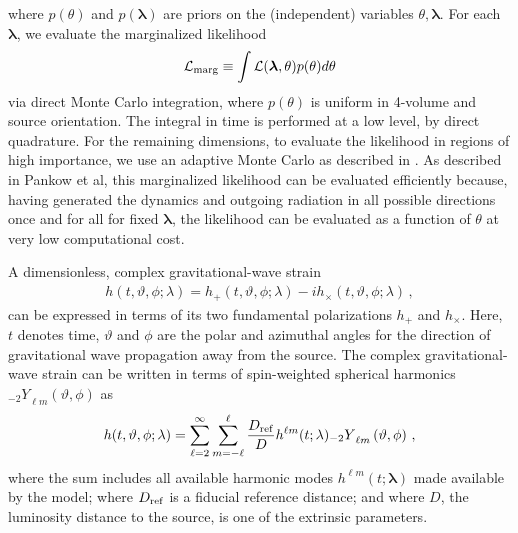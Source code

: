 \documentclass[twocolumn,prd,nofootinbib]{revtex4}
\newcommand\Y[1]{{{}_{#1}Y}}
\begin{document}
where $p(\theta)$ and $p(\bm{\lambda})$ are priors on the (independent) variables $\theta ,\bm{\lambda}$. For each $\bm{\lambda}$, we evaluate the marginalized likelihood
\begin{equation}
 {\cal L}_{\rm marg}\equiv\int  {\cal L}(\bm{\lambda} ,\theta )p(\theta )d\theta
\end{equation}
via direct Monte Carlo integration, where $p(\theta)$ is uniform in 4-volume and source orientation.  
The integral in time is performed at a low level, by direct quadrature. 
For the remaining dimensions, to evaluate the likelihood in regions of high importance, we use an adaptive Monte Carlo as described in
\cite{gwastro-PE-AlternativeArchitectures}.    As described in Pankow et al, this marginalized likelihood can be evaluated efficiently
because, having generated the dynamics and outgoing radiation in all possible directions once and for all for fixed
$\mathbf{\lambda}$, the likelihood can be evaluated as a function of $\theta$ at very low computational cost.


A dimensionless, complex gravitational-wave
strain
\begin{align} \label{eq:strain}
h(t,\vartheta,\phi;\lambda) =  h_+(t,\vartheta,\phi;\lambda) - 
                                i h_\times (t,\vartheta,\phi;\lambda) \, ,
\end{align}
can be expressed in terms of its two fundamental polarizations $h_+$ and $h_\times$.
Here, $t$ denotes time, $\vartheta$ and $\phi$ are the polar and azimuthal angles
for the direction of gravitational wave propagation away from the source. 
The complex gravitational-wave strain can be written in terms of
spin-weighted spherical harmonics $\Y{-2}_{\ell m} \left(\vartheta, \phi \right)$ as 
\begin{align} \label{eq:strain_mode}
h(t,\vartheta,\phi;\lambda) = 
\sum_{\ell=2}^{\infty} \sum_{m=-\ell}^{\ell} \frac{D_{\rm ref}}{D} h^{\ell m}(t;\lambda) \Y{-2}_{\ell m} \left(\vartheta, \phi \right) \, ,
\end{align}
where the sum includes all available harmonic modes $h^{\ell m}(t;\pmb{\lambda})$ made available by the model;  where
$D_{\rm ref}$ is a fiducial reference distance; and where $D$, the luminosity distance to the  source, is one of the
extrinsic parameters.  
\end{document}
